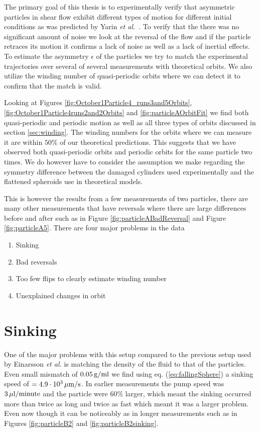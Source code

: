 The primary goal of this thesis is to experimentally verify that asymmetric particles in shear flow exhibit different types of motion for different initial conditions as was predicted by Yarin \emph{et al.}~\cite{Yarin}. To verify that the there was no significant amount of noise we look at the reversal of the flow and if the particle retraces its motion it confirms a lack of noise as well as a lack of inertial effects. To estimate the asymmetry $\epsilon$ of the particles we try to match the experimental trajectories over several of several measurements with theoretical orbits. We also utilize the winding number of quasi-periodic orbits where we can detect it to confirm that the match is valid.

Looking at Figures \ref{fig:October1Particle4_runs3and5Orbits}, \ref{fig:October1Particle4runs2and2Orbits} and \ref{fig:particleAOrbitFit} we find both quasi-periodic and periodic motion as well as all three types of orbits discussed in section \ref{sec:winding}. The winding numbers for the orbits where we can measure it are within $50\%$ of our theoretical predictions. This suggests that we have observed both quasi-periodic orbits and periodic orbits for the same particle two times. We do however have to consider the assumption we make regarding the symmetry difference between the damaged cylinders used experimentally and the flattened spheroids use in theoretical models.

This is however the results from a few measurements of two particles, there are many other measurements that have reversals where there are large differences before and after such as in Figure \ref{fig:particleABadReversal} and Figure \ref{fig:particleA5}. There are four major problems in the data 

\begin{enumerate}
\item Sinking
\item Bad reversals
\item Too few flips to clearly estimate winding number
\item Unexplained changes in orbit
\end{enumerate}

\section{Sinking}
One of the major problems with this setup compared to the previous setup used by Einarsson \emph{et al.} \cite{JonasExperiment} is matching the density of the fluid to that of the particles. Even small mismatch of $\unit[0.05]{g/ml}$ we find using eq. (\ref{eq:fallingSphere}) a sinking speed of $= \unit[4.9\cdot10^3 ]{\mu m/s}$. In earlier measurements the pump speed was $\unit[3]{\mu l/minute}$ and the particle were 60\% larger, which meant the sinking occurred more than twice as long and twice as fast which meant it was a larger problem. Even now though it can be noticeably as in longer measurements such as in Figures \ref{fig:particleB2} and \ref{fig:particleB2sinking}.

